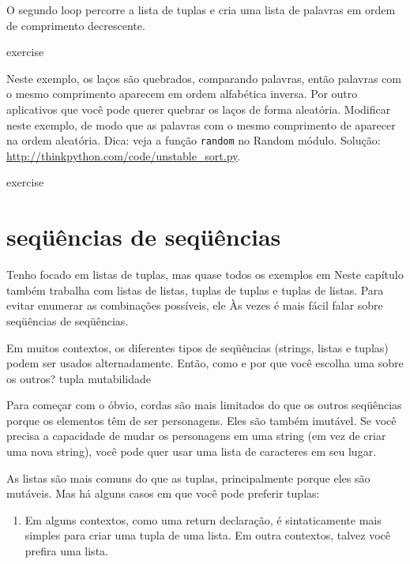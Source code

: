 \documentclass[10pt]{book}
\begin{document}
\begin{exercise}
\begin{v erbatim}
O segundo loop percorre a lista de tuplas e cria uma lista de
palavras em ordem de comprimento decrescente.

\begin{} exercise

Neste exemplo, os laços são quebrados, comparando palavras, então palavras
com o mesmo comprimento aparecem em ordem alfabética inversa. Por outro
aplicativos que você pode querer quebrar os laços de forma aleatória. Modificar
neste exemplo, de modo que as palavras com o mesmo comprimento de aparecer na
ordem aleatória. Dica: veja a função {\tt random} no
{Random \tt} módulo.
Solução: \url{http://thinkpython.com/code/unstable_sort.py}.


\end{} exercise


\section{seqüências de seqüências}

Tenho focado em listas de tuplas, mas quase todos os exemplos em
Neste capítulo também trabalha com listas de listas, tuplas de tuplas e
tuplas de listas. Para evitar enumerar as combinações possíveis, ele
Às vezes é mais fácil falar sobre seqüências de seqüências.

Em muitos contextos, os diferentes tipos de seqüências (strings, listas e
tuplas) podem ser usados ​​alternadamente. Então, como e por que você escolha uma
sobre os outros?
\index{} tupla
\index{} mutabilidade

Para começar com o óbvio, cordas são mais limitados do que os outros
seqüências porque os elementos têm de ser personagens. Eles são
também imutável. Se você precisa a capacidade de mudar os personagens
em uma string (em vez de criar uma nova string), você pode
quer usar uma lista de caracteres em seu lugar.

As listas são mais comuns do que as tuplas, principalmente porque eles são mutáveis.
Mas há alguns casos em que você pode preferir tuplas:

\begin{enumerate}

\item Em alguns contextos, como uma {return \tt} declaração, é
sintaticamente mais simples para criar uma tupla de uma lista. Em outra
contextos, talvez você prefira uma lista.


\end{enumerate}
\end{v erbatim}
\end{exercise}
\end{document}
